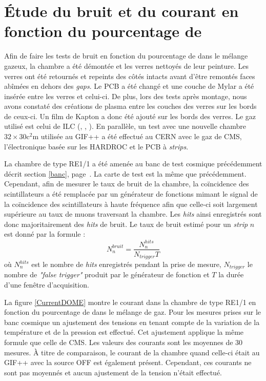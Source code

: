  \section{Étude du bruit et du courant en fonction du pourcentage de \texorpdfstring{}{SF6}}
 \label{SF66}
 Afin de faire les tests de bruit en fonction du pourcentage de  dans le mélange gazeux, la chambre a été démontée et les verres nettoyés de leur peinture. Les verres ont été retournés et repeints des côtés intacts avant d'être remontés faces abîmées en dehors des \textit{gaps}. Le PCB a été changé et une couche de Mylar a été insérée entre les verres et celui-ci. De plus, lors des tests après montage, nous avons constaté des créations de plasma entre les couches des verres sur les bords de ceux-ci. Un film de Kapton a donc été ajouté sur les bords des verres. Le gaz utilisé est celui de ILC (, , ). En parallèle, un test avec une nouvelle chambre $\num{32}\times\num{30}\si{\square\centi\meter}$ utilisée au GIF++ a été effectué au CERN avec le gaz de CMS, l'électronique basée sur les HARDROC et le PCB à \textit{strips}.
 
 La chambre de type RE1/1 a été amenée au banc de test cosmique précédemment décrit section \ref{banc}, page~\pageref{banc}. La carte de test est la même que précédemment. Cependant, afin de mesurer le taux de bruit de la chambre, la coïncidence des scintillateurs a été remplacée par un générateur de fonctions mimant le signal de la coïncidence des scintillateurs à haute fréquence afin que celle-ci soit largement supérieure au taux de muons traversant la chambre. Les \textit{hits} ainsi enregistrés sont donc majoritairement des \textit{hits} de bruit. Le taux de bruit estimé pour un \textit{strip} $n$ est donné par la formule :
 \begin{equation}
 N_n^{bruit}=\frac{N_n^{hits}}{N_{trigger}T}
 \end{equation}
 où $N_n^{hits}$ est le nombre de \textit{hits} enregistrés pendant la prise de mesure, $N_{trigger}$ le nombre de \textit{"false trigger"} produit par le générateur de fonction et $T$ la durée d'une fenêtre d'acquisition.
 
 La figure \ref{CurrentDOME} montre le courant dans la chambre de type RE1/1 en fonction du pourcentage de  dans le mélange de gaz. Pour les mesures prises sur le banc cosmique un ajustement des tensions en tenant compte de la variation de la température et de la pression est effectué. Cet ajustement applique la même formule que celle de CMS. Les valeurs des courants sont les moyennes de \num{30} mesures. À titre de comparaison, le courant de la chambre quand celle-ci était au GIF++ avec la source OFF est également présent. Cependant, ces courants ne sont pas moyennés et aucun ajustement de la tension n'était effectué.
 
